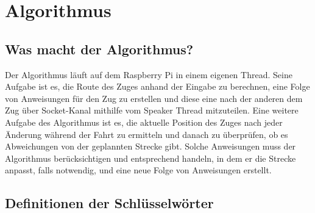\renewcommand{\baselinestretch}{1.5} 
%

\chapter{Algorithmus}
\section{Was macht der Algorithmus?}
Der Algorithmus läuft auf dem Raspberry Pi in einem eigenen Thread. Seine Aufgabe ist es, die Route des Zuges anhand der Eingabe zu berechnen, eine Folge von Anweisungen für den Zug zu erstellen und diese eine nach der anderen dem Zug über Socket-Kanal mithilfe vom Speaker Thread mitzuteilen. Eine weitere Aufgabe des Algorithmus ist es, die aktuelle Position des Zuges nach jeder Änderung während der Fahrt zu ermitteln und danach zu überprüfen, ob es Abweichungen von der geplannten Strecke gibt. Solche Anweisungen muss der Algorithmus berücksichtigen und entsprechend handeln, in dem er die Strecke anpasst, falls notwendig, und eine neue Folge von Anweisungen erstellt.

\section{Definitionen der Schlüsselwörter}

